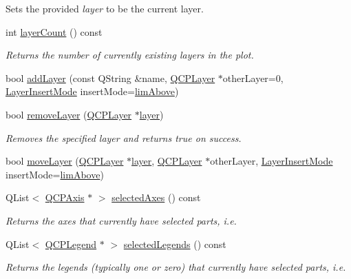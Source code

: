 \begin{DoxyCompactItemize}
\begin{DoxyCompactList}
Sets the provided {\itshape layer} to be the current layer. \end{DoxyCompactList}\item 
int \hyperlink{a00116_a1b3926884f5bd4bdda1495d8b3c891d0}{layer\+Count} () const 
\begin{DoxyCompactList}\small\item\em Returns the number of currently existing layers in the plot. \end{DoxyCompactList}\item 
bool \hyperlink{a00116_acfae623ec58e4f9e35014062580e4720}{add\+Layer} (const Q\+String \&name, \hyperlink{a00043}{Q\+C\+P\+Layer} $\ast$other\+Layer=0, \hyperlink{a00116_acf68ae22e9b44e959fc82bc6366e9b8d}{Layer\+Insert\+Mode} insert\+Mode=\hyperlink{a00116_acf68ae22e9b44e959fc82bc6366e9b8da065748f172d5a34ffd1e09924d55cc17}{lim\+Above})
\item 
bool \hyperlink{a00116_a40f75e342c5eaab6a86066a42a0e2a94}{remove\+Layer} (\hyperlink{a00043}{Q\+C\+P\+Layer} $\ast$\hyperlink{a00116_a1b7efcbaf6ed6181f1a28f3d486f8837}{layer})
\begin{DoxyCompactList}\small\item\em Removes the specified {\itshape layer} and returns true on success. \end{DoxyCompactList}\item 
bool \hyperlink{a00116_ad18d1ff9086f2e658b81d67d3c84a0c3}{move\+Layer} (\hyperlink{a00043}{Q\+C\+P\+Layer} $\ast$\hyperlink{a00116_a1b7efcbaf6ed6181f1a28f3d486f8837}{layer}, \hyperlink{a00043}{Q\+C\+P\+Layer} $\ast$other\+Layer, \hyperlink{a00116_acf68ae22e9b44e959fc82bc6366e9b8d}{Layer\+Insert\+Mode} insert\+Mode=\hyperlink{a00116_acf68ae22e9b44e959fc82bc6366e9b8da065748f172d5a34ffd1e09924d55cc17}{lim\+Above})
\item 
Q\+List$<$ \hyperlink{a00025}{Q\+C\+P\+Axis} $\ast$ $>$ \hyperlink{a00116_aa6baf867e8beb96ed5bd471f83ece903}{selected\+Axes} () const 
\begin{DoxyCompactList}\small\item\em Returns the axes that currently have selected parts, i.\+e. \end{DoxyCompactList}\item 
Q\+List$<$ \hyperlink{a00045}{Q\+C\+P\+Legend} $\ast$ $>$ \hyperlink{a00116_a1ea6297300c3e2770e65f95836411755}{selected\+Legends} () const 
\begin{DoxyCompactList}\small\item\em Returns the legends (typically one or zero) that currently have selected parts, i.\+e. \end{DoxyCompactList}\item 

\end{DoxyCompactItemize}
